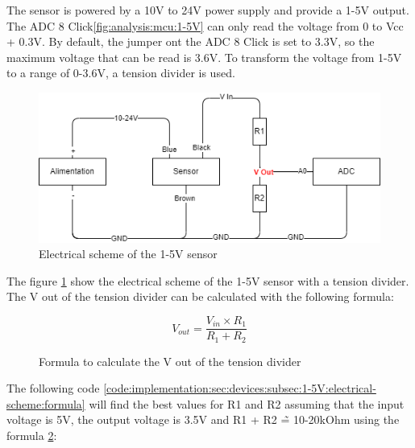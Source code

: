 The sensor is powered by a 10V to 24V power supply and provide a 1-5V output.
The ADC 8 Click\ref{fig:analysis:mcu:1-5V} can only read the voltage from 0 to Vcc + 0.3V.
By default, the jumper ont the ADC 8 Click is set to 3.3V, so the maximum voltage that can be read is 3.6V.
To transform the voltage from 1-5V to a range of 0-3.6V, a tension divider is used.

\begin{figure}[H]
  \centering
  \includegraphics[width=1\textwidth]{img/implementation_tensionDivider.drawio.png}
  \caption{Electrical scheme of the 1-5V sensor}
  \label{fig:implementation:sec:devices:subsec:1-5V:electrical-scheme}
\end{figure}

The figure \ref{fig:implementation:sec:devices:subsec:1-5V:electrical-scheme} show the electrical scheme of the 1-5V sensor with a tension divider.
The V out of the tension divider can be calculated with the following formula:

\begin{figure}[ht]
  \centering
  \[ V_{out} = \frac{V_{in} \times R_1}{R_1 + R_2} \]
  \caption{Formula to calculate the V out of the tension divider}
  \label{fig:implementation:sec:devices:subsec:1-5V:electrical-scheme:formula}
\end{figure}

The following code \ref{code:implementation:sec:devices:subsec:1-5V:electrical-scheme:formula}
will find the best values for R1 and R2 assuming that the input voltage is 5V, the output voltage is 3.5V and
R1 + R2 \~= 10-20kOhm using the formula \ref{fig:implementation:sec:devices:subsec:1-5V:electrical-scheme:formula}:

